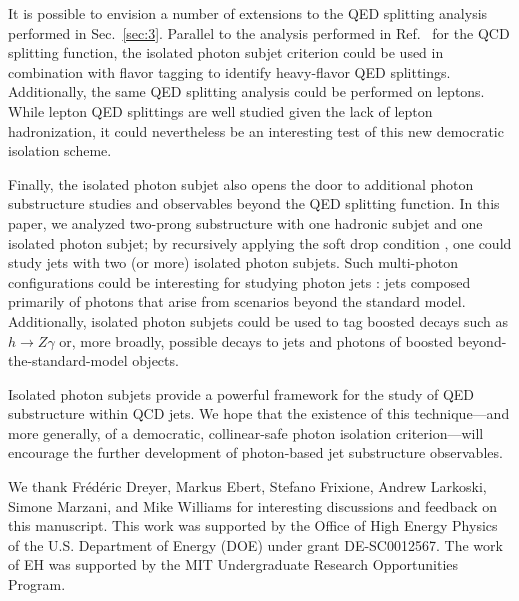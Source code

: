 \documentclass[a4paper,11pt]{article}
\DeclareRobustCommand{\Sec}[1]{Sec.~\ref{#1}}
\DeclareRobustCommand{\Ref}[1]{Ref.~\cite{#1}}
\begin{document}
It is possible to envision a number of extensions to the QED splitting analysis performed in \Sec{sec:3}.
%
Parallel to the analysis performed in \Ref{Ilten:2017rbd} for the QCD splitting function, the isolated photon subjet criterion could be used in combination with flavor tagging to identify heavy-flavor QED splittings.
%
Additionally, the same QED splitting analysis could be performed on leptons.
%
While lepton QED splittings are well studied given the lack of lepton hadronization, it could nevertheless be an interesting test of this new democratic isolation scheme.

Finally, the isolated photon subjet also opens the door to additional photon substructure studies and observables beyond the QED splitting function.
%
In this paper, we analyzed two-prong substructure with one hadronic subjet and one isolated photon subjet; by recursively applying the soft drop condition \cite{Dreyer:2018tjj}, one could study jets with two (or more) isolated photon subjets.
%
Such multi-photon configurations could be interesting for studying photon jets \cite{Ellis:2012zp}: jets composed primarily of photons that arise from scenarios beyond the standard model.
%
Additionally, isolated photon subjets could be used to tag boosted decays such as $h \rightarrow Z \gamma$ or, more broadly, possible decays to jets and photons of boosted beyond-the-standard-model objects.

Isolated photon subjets provide a powerful framework for the study of QED substructure within QCD jets.
%
We hope that the existence of this technique---and more generally, of a democratic, collinear-safe photon isolation criterion---will encourage the further development of photon-based jet substructure observables.

\begin{acknowledgments}

We thank Fr\'{e}d\'{e}ric Dreyer, Markus Ebert, Stefano Frixione, Andrew Larkoski, Simone Marzani, and Mike Williams for interesting discussions and feedback on this manuscript.
%
This work was supported by the Office of High Energy Physics of the U.S. Department of Energy (DOE) under grant DE-SC0012567.
%
The work of EH was supported by the MIT Undergraduate Research Opportunities Program.

\end{acknowledgments}



\end{document}
